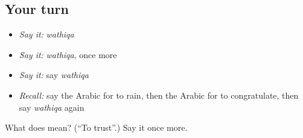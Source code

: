 \subsection*{Your turn}
\begin{itemize}
\raggedright
  \item \emph{Say it:} \emph{wathiqa}
  \item \emph{Say it:} \emph{wathiqa}, once more
  \item \emph{Say it:} say \emph{wathiqa}
  \item \emph{Recall:} say the Arabic for to rain, then the Arabic for to congratulate, then say \emph{wathiqa} again
\end{itemize}

\begin{tcolorbox}[breakable,colback=teal!4,colframe=teal!35!black,title={Before you move on}]
What does  mean? (\textquotedblleft{}To trust\textquotedblright{}.) Say it once more.
\end{tcolorbox}

